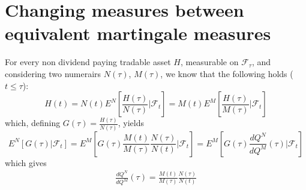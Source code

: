 \documentclass[12pt, a4paper]{article}
\newcommand\be{\begin{eqnarray}}
\newcommand\ee{\end{eqnarray}}
\newcommand{\FF} {\mathcal{F} }
\begin{document}
\section{Changing measures between equivalent martingale measures}
For every non dividend paying tradable asset $H$, measurable on $\FF_{\tau}$, and considering two numerairs $N(\tau)$, $M(\tau)$, we know that the following holds ($t\leq \tau$):
\[
H(t)=N(t) E^N\left[\frac{H(\tau)}{N(\tau)} | \FF_t \right]=M(t) E^M\left[\frac{H(\tau)}{M(\tau)} | \FF_t \right]
\]
which, defining $G(\tau)=\frac{H(\tau)}{N(\tau)}$, yields
\[
E^N\left[G(\tau)| \FF_t \right]= E^M\left[ G(\tau) \frac{M(t)}{M(\tau)} \frac{N(\tau)}{N(t)}| \FF_t \right]= E^M\left[G(\tau) \frac{dQ^N}{dQ^M}(\tau) | \FF_t \right]
\]
which gives
\be 
\frac{dQ^N}{dQ^M}(\tau) =  \frac{M(t)}{M(\tau)} \frac{N(\tau)}{N(t)}
\label{radniknumeraires}
\ee
\end{document}
